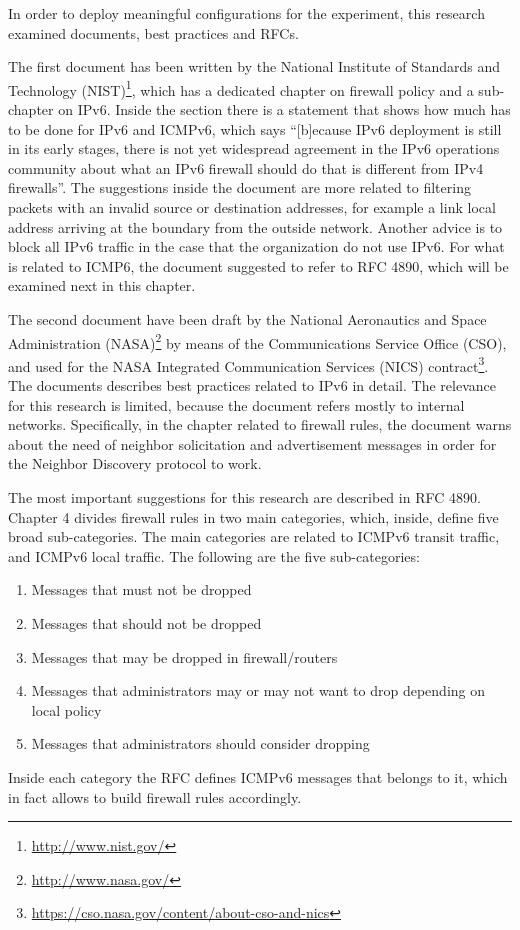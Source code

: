 \documentclass[12pt]{article}
\begin{document}
In order to deploy meaningful configurations for the experiment, this research examined documents, best practices and RFCs. 

The first document has been written by the National Institute of Standards and Technology (NIST)\footnote{\url{http://www.nist.gov/}}, which has a dedicated chapter on firewall policy and a sub-chapter on IPv6. Inside the section there is a statement that shows how much has to be done for IPv6 and ICMPv6, which says ``[b]ecause IPv6 deployment is still in its early stages, there is not yet widespread agreement in the IPv6 operations community about what an IPv6 firewall should do that is different from IPv4 firewalls''. The suggestions inside the document are more related to filtering packets with an invalid source or destination addresses, for example a link local address arriving at the boundary from the outside network. Another advice is to block all IPv6 traffic in the case that the organization do not use IPv6. For what is related to ICMP6, the document suggested to refer to RFC 4890, which will be examined next in this chapter.\cite{nist}

The second document have been draft by the National Aeronautics and Space Administration (NASA)\footnote{\url{http://www.nasa.gov/}} by means of the Communications Service Office (CSO), and used for the NASA Integrated Communication Services (NICS) contract\footnote{\url{https://cso.nasa.gov/content/about-cso-and-nics}}. The documents describes best practices related to IPv6 in detail. The relevance for this research is limited, because the document refers mostly to internal networks. Specifically, in the chapter related to firewall rules, the document warns about the need of neighbor solicitation and advertisement messages in order for the Neighbor Discovery protocol to work\cite{nics}.

The most important suggestions for this research are described in RFC 4890. Chapter 4 divides firewall rules in two main categories, which, inside, define five broad sub-categories. The main categories are related to ICMPv6 transit traffic, and ICMPv6 local traffic. The following are the five sub-categories:

\vspace{-15pt}
\begin{enumerate}[noitemsep,topsep=0pt,partopsep=0pt]
 \item Messages that must not be dropped
 \item Messages that should not be dropped
 \item Messages that may be dropped in firewall/routers
 \item Messages that administrators may or may not want to drop depending on local policy
 \item Messages that administrators should consider dropping
\end{enumerate}
Inside each category the RFC defines ICMPv6 messages that belongs to it, which in fact allows to build firewall rules accordingly\cite{rfc4890}.
\end{document}
